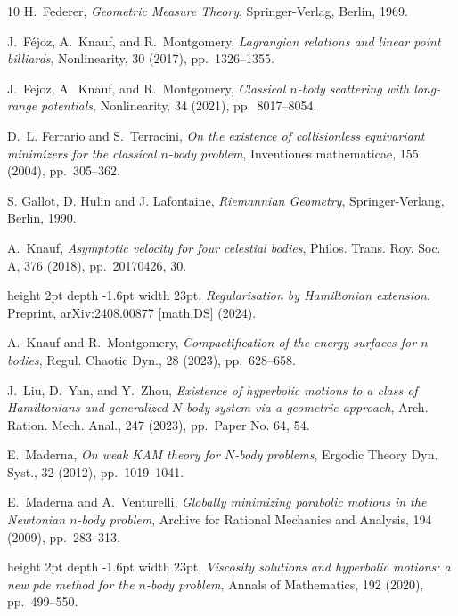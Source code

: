 \documentclass[a4paper,10pt]{amsart}
\theoremstyle{plain}
\theoremstyle{definition}
\numberwithin{equation}{section}
\numberwithin{thm}{section}
\begin{document}
\begin{thebibliography}{10}
{\sc H.~Federer}, {\em Geometric Measure Theory}, Springer-Verlag, Berlin,
  1969.

{\sc J.~F{\'e}joz, A.~Knauf, and R.~Montgomery}, {\em Lagrangian relations and
  linear point billiards}, Nonlinearity, 30 (2017), pp.~1326--1355.

{\sc J.~Fejoz, A.~Knauf, and R.~Montgomery}, {\em Classical {$n$}-body
  scattering with long-range potentials}, Nonlinearity, 34 (2021),
  pp.~8017--8054.

{\sc D.~L. Ferrario and S.~Terracini}, {\em On the existence of collisionless
  equivariant minimizers for the classical $n$-body problem}, Inventiones
  mathematicae, 155 (2004), pp.~305--362.
  
  {\sc S. Gallot, D. Hulin and J. Lafontaine}, {\em Riemannian Geometry}, Springer-Verlang, Berlin, 1990. 

{\sc A.~Knauf}, {\em Asymptotic velocity for four celestial bodies}, Philos.
  Trans. Roy. Soc. A, 376 (2018), pp.~20170426, 30.

\leavevmode\vrule height 2pt depth -1.6pt width 23pt, {\em Regularisation by
  {Hamiltonian} extension}.
\newblock Preprint, {arXiv}:2408.00877 [math.{DS}] (2024).

{\sc A.~Knauf and R.~Montgomery}, {\em Compactification of the energy surfaces
  for {{\(n\)}} bodies}, Regul. Chaotic Dyn., 28 (2023), pp.~628--658.

{\sc J.~Liu, D.~Yan, and Y.~Zhou}, {\em Existence of hyperbolic motions to a
  class of {H}amiltonians and generalized {$N$}-body system via a geometric
  approach}, Arch. Ration. Mech. Anal., 247 (2023), pp.~Paper No. 64, 54.

{\sc E.~Maderna}, {\em On weak {KAM} theory for {{\(N\)}}-body problems},
  Ergodic Theory Dyn. Syst., 32 (2012), pp.~1019--1041.

{\sc E.~Maderna and A.~Venturelli}, {\em Globally minimizing parabolic motions
  in the {N}ewtonian $n$-body problem}, Archive for Rational Mechanics and
  Analysis, 194 (2009), pp.~283--313.

\leavevmode\vrule height 2pt depth -1.6pt width 23pt, {\em Viscosity solutions
  and hyperbolic motions: a new pde method for the $n$-body problem}, Annals of
  Mathematics, 192 (2020), pp.~499--550.


\end{thebibliography}
\end{document}

